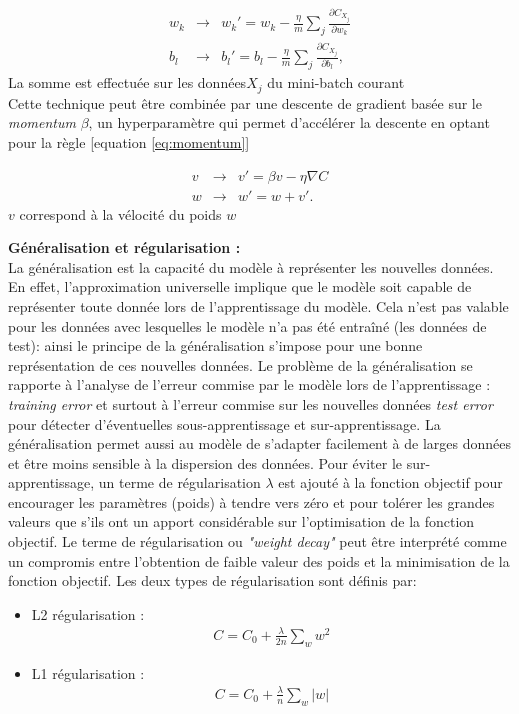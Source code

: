 \begin{eqnarray} 
\label{eq:sgd}
w_k & \rightarrow & w_k' = w_k-\frac{\eta}{m} \sum_j \frac{\partial C_{X_j}}{\partial w_k} \\ b_l & \rightarrow & b_l' = b_l-\frac{\eta}{m} \sum_j \frac{\partial C_{X_j}}{\partial b_l}, \end{eqnarray} La somme est effectuée sur les données$X_j$ du mini-batch courant
\\
Cette technique peut être combinée par une descente de gradient basée sur le \textit{momentum} $\beta$, un hyperparamètre qui permet d'accélérer la descente en optant pour la règle [equation \ref{eq:momentum}]

\begin{eqnarray} 
\label{eq:momentum}
v & \rightarrow & v' = \beta v - \eta \nabla C \\ w & \rightarrow & w' = w+v'. \end{eqnarray}
$v$ correspond à la vélocité du poids $w$

\smallskip
\textbf{Généralisation et régularisation :}\\

\qquad La généralisation est la capacité du modèle à représenter les nouvelles données.	
En effet, l'approximation universelle implique que le modèle soit capable de représenter toute donnée lors de l'apprentissage du modèle. Cela n'est pas valable pour les données avec lesquelles le modèle n'a pas été entraîné (les données de test): ainsi le principe de la généralisation s'impose pour une bonne représentation de ces nouvelles données. Le problème de la généralisation se rapporte à l'analyse de l'erreur commise par le modèle lors de l'apprentissage : \textit{training error} et surtout à l'erreur commise sur les nouvelles données \textit{test error}  pour détecter d'éventuelles sous-apprentissage et sur-apprentissage.
La généralisation permet aussi au modèle de s'adapter facilement à de larges données et être moins sensible à la dispersion des données.
	Pour éviter le sur-apprentissage, un terme de régularisation $\lambda$ est ajouté à la fonction objectif pour encourager les paramètres (poids) à tendre vers zéro et pour tolérer les grandes valeurs que s'ils ont un apport considérable sur l'optimisation de la fonction objectif. Le terme de régularisation ou \textit{"weight decay"} peut être interprété comme un compromis entre l'obtention de faible valeur des poids et la minimisation de la fonction objectif. Les deux types de régularisation sont définis par:
\begin{itemize}
	\item L2 régularisation : \begin{eqnarray} C = C_0 + \frac{\lambda}{2n} \sum_w w^2 \end{eqnarray}

	\item L1 régularisation : \begin{eqnarray} C = C_0 + \frac{\lambda}{n} \sum_w |w| \end{eqnarray}
\end{itemize}


